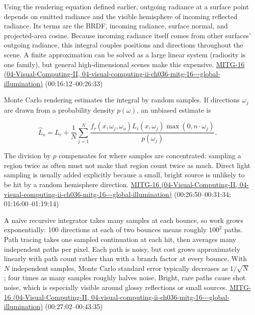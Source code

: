 Using the rendering equation defined earlier, outgoing radiance at a surface point depends on emitted radiance and the visible hemisphere of incoming reflected radiance. Its terms are the BRDF, incoming radiance, surface normal, and projected-area cosine. Because incoming radiance itself comes from other surfaces' outgoing radiance, this integral couples positions and directions throughout the scene. A finite approximation can be solved as a large linear system (radiosity is one family), but general high-dimensional scenes make this expensive. \href{../04-Visual-Computing-II/main.pdf\#nameddest=04-visual-computing-ii-ch036-mitg-16---global-illumination}{MITG-16 (04-Visual-Computing-II, 04-visual-computing-ii-ch036-mitg-16-\/-\/-global-illumination)} (00:16:12--00:26:33)

Monte Carlo rendering estimates the integral by random samples. If directions \(\omega_j\) are drawn from a probability density \(p(\omega)\), an unbiased estimate is

\[
\widehat L_o=L_e+\frac1N\sum_{j=1}^{N}\frac{f_r(x,\omega_j,\omega_o)L_i(x,\omega_j)\max(0,n\cdot\omega_j)}{p(\omega_j)}.
\]

The division by \(p\) compensates for where samples are concentrated: sampling a region twice as often must not make that region count twice as much. Direct light sampling is usually added explicitly because a small, bright source is unlikely to be hit by a random hemisphere direction. \href{../04-Visual-Computing-II/main.pdf\#nameddest=04-visual-computing-ii-ch036-mitg-16---global-illumination}{MITG-16 (04-Visual-Computing-II, 04-visual-computing-ii-ch036-mitg-16-\/-\/-global-illumination)} (00:26:50--00:31:34; 01:16:00--01:19:14)

A naïve recursive integrator takes many samples at each bounce, so work grows exponentially: 100 directions at each of two bounces means roughly \(100^2\) paths. Path tracing takes one sampled continuation at each hit, then averages many independent paths per pixel. Each path is noisy, but cost grows approximately linearly with path count rather than with a branch factor at every bounce. With \(N\) independent samples, Monte Carlo standard error typically decreases as \(1/\sqrt{N}\); four times as many samples roughly halves noise. Bright, rare paths cause shot noise, which is especially visible around glossy reflections or small sources. \href{../04-Visual-Computing-II/main.pdf\#nameddest=04-visual-computing-ii-ch036-mitg-16---global-illumination}{MITG-16 (04-Visual-Computing-II, 04-visual-computing-ii-ch036-mitg-16-\/-\/-global-illumination)} (00:27:02--00:43:35)

